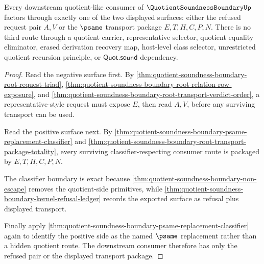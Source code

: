 \begin{theorem}
\label{thm:quotient-soundness-boundary-downstream-factorization-exactness}
Every downstream quotient-like consumer of $\QuotientSoundnessBoundaryUp$ factors through exactly one of the two displayed surfaces: either the refused request pair $A,V$ or the $\psame$ transport package $E,T,H,C,P,N$. There is no third route through a quotient carrier, representative selector, quotient equality eliminator, erased derivation recovery map, host-level class selector, unrestricted quotient recursion principle, or $\mathsf{Quot.sound}$ dependency.
\end{theorem}
\begin{proof}
Read the negative surface first. By \autoref{thm:quotient-soundness-boundary-root-request-triad}, \autoref{thm:quotient-soundness-boundary-root-relation-row-exposure}, and \autoref{thm:quotient-soundness-boundary-root-transport-verdict-order}, a representative-style request must expose $E$, then read $A,V$, before any surviving transport can be used.

Read the positive surface next. By \autoref{thm:quotient-soundness-boundary-psame-replacement-classifier} and \autoref{thm:quotient-soundness-boundary-root-transport-package-totality}, every surviving classifier-respecting consumer route is packaged by $E,T,H,C,P,N$.

The classifier boundary is exact because \autoref{thm:quotient-soundness-boundary-non-escape} removes the quotient-side primitives, while \autoref{thm:quotient-soundness-boundary-kernel-refusal-ledger} records the exported surface as refusal plus displayed transport.

Finally apply \autoref{thm:quotient-soundness-boundary-psame-replacement-classifier} again to identify the positive side as the named $\psame$ replacement rather than a hidden quotient route. The downstream consumer therefore has only the refused pair or the displayed transport package.
\end{proof}


